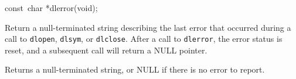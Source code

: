 \begin{apisyn}

	\funcproto const~char *dlerror(void);
\end{apisyn}
\begin{apidesc}
	Return a null-terminated string describing the last error that
	occurred during a call to \texttt{dlopen}, \texttt{dlsym}, or
	\texttt{dlclose}. After a call to \texttt{dlerror}, the error
	status is reset, and a subsequent call will return a NULL pointer. 
\end{apidesc}
\begin{apiret}
	Returns a null-terminated string, or NULL if there is no error to
	report. 
\end{apiret}


